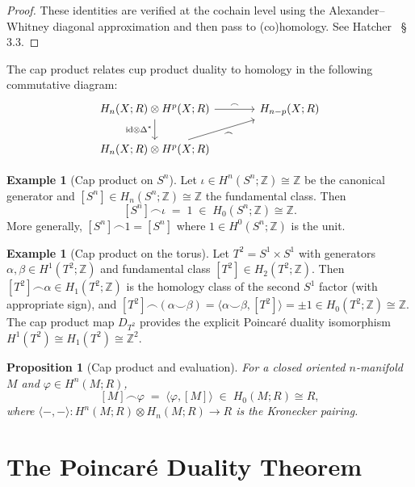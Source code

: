 \documentclass[12pt,a4paper,openany]{book}
\theoremstyle{definition}
\newtheorem{example}[definition]{Example}
\theoremstyle{plain}
\newtheorem{proposition}[definition]{Proposition}
\theoremstyle{remark}
\newcommand{\Z}{\mathbb{Z}}
\begin{document}
\begin{proof}
These identities are verified at the cochain level using the
Alexander--Whitney diagonal approximation
and then pass to (co)homology.  See Hatcher~\cite{hatcher} \S\,3.3.
\end{proof}

The cap product relates cup product duality to homology in the
following commutative diagram:
\[
\begin{tikzcd}[column sep=large]
  H_n(X;R)\otimes H^p(X;R) \ar[r,"\frown"]
    \ar[d,"\mathrm{id}\otimes\Delta^*"']
  & H_{n-p}(X;R) \\
  H_n(X;R)\otimes H^p(X;R) \ar[ru,"\frown"']
\end{tikzcd}
\]

\begin{example}[Cap product on $S^n$]
Let $\iota\in H^n(S^n;\Z)\cong\Z$ be the canonical generator and
$[S^n]\in H_n(S^n;\Z)\cong\Z$ the fundamental class.  Then
\[
  [S^n]\frown\iota \;=\; 1 \;\in\; H_0(S^n;\Z)\cong\Z.
\]
More generally, $[S^n]\frown 1 = [S^n]$ where
$1\in H^0(S^n;\Z)$ is the unit.
\end{example}

\begin{example}[Cap product on the torus]
Let $T^2=S^1\times S^1$ with generators $\alpha,\beta\in H^1(T^2;\Z)$
and fundamental class $[T^2]\in H_2(T^2;\Z)$.  Then
$[T^2]\frown\alpha\in H_1(T^2;\Z)$ is the homology class of the
second $S^1$ factor (with appropriate sign), and
$[T^2]\frown(\alpha\smile\beta) = \langle\alpha\smile\beta,[T^2]\rangle
= \pm1\in H_0(T^2;\Z)\cong\Z$.  The cap product map $D_{T^2}$
provides the explicit Poincar\'e duality isomorphism
$H^1(T^2)\cong H_1(T^2)\cong\Z^2$.
\end{example}

\begin{proposition}[Cap product and evaluation]
\label{prop:cap-evaluation}
For a closed oriented $n$-manifold~$M$ and $\varphi\in H^n(M;R)$,
\[
  [M]\frown\varphi \;=\; \langle\varphi,[M]\rangle \;\in\;
  H_0(M;R)\cong R,
\]
where $\langle-,-\rangle\colon H^n(M;R)\otimes H_n(M;R)\to R$ is the
Kronecker pairing.
\end{proposition}

\section{The Poincar\'e Duality Theorem}\label{sec:pd-theorem}
\end{document}
